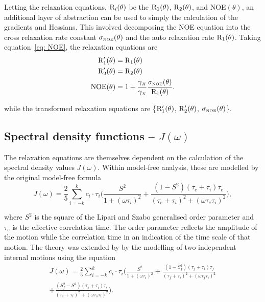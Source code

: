 Letting the relaxation equations, $\mathrm{R}_i(\theta)$ be the $\mathrm{R}_1(\theta)$, $\mathrm{R}_2(\theta)$, and NOE$(\theta)$, an additional layer of abstraction can be used to simply the calculation of the gradients and Hessians.  This involved decomposing the NOE equation into the cross relaxation rate constant $\sigma_{\scriptscriptstyle \mathrm{NOE}}(\theta)$ and the auto relaxation rate $\mathrm{R}_1(\theta)$.  Taking equation~\eqref{eq: NOE}, the relaxation equations are
\begin{align}
 \mathrm{R}_1'(\theta) &= \mathrm{R}_1(\theta) \\
 \mathrm{R}_2'(\theta) &= \mathrm{R}_2(\theta) \\
 \mathrm{NOE}(\theta)  &= 1 + \frac{\gamma_{\scriptscriptstyle H}}{\gamma_{\scriptscriptstyle X}} \frac{\sigma_{\scriptscriptstyle \mathrm{NOE}}(\theta)}{\mathrm{R}_1(\theta)}.
\end{align}

\noindent while the transformed relaxation equations are \{$\mathrm{R}_1'(\theta)$, $\mathrm{R}_2'(\theta)$, $\sigma_{\scriptscriptstyle \mathrm{NOE}}(\theta)$\}.


\subsection{Spectral density functions -- $J(\omega)$}

The relaxation equations are themselves dependent on the calculation of the spectral density values $J(\omega)$.  Within model-free analysis, these are modelled by the original model-free formula \citep{LipariSzabo82a, LipariSzabo82b}
\begin{equation} \label{eq: J(w) model-free generic}
 J(\omega) = \frac{2}{5} \sum_{i=-k}^k c_i \cdot \tau_i \Bigg(
  \frac{S^2}{1 + (\omega \tau_i)^2}
  + \frac{(1 - S^2)(\tau_e + \tau_i)\tau_e}{(\tau_e + \tau_i)^2 + (\omega \tau_e \tau_i)^2}
 \Bigg),
\end{equation}

\noindent where $S^2$ is the square of the Lipari and Szabo generalised order parameter and $\tau_e$ is the effective correlation time.  The order parameter reflects the amplitude of the motion while the correlation time in an indication of the time scale of that motion.  The theory was extended by \citet{Clore90} by the modelling of two independent internal motions using the equation
\begin{multline} \label{eq: J(w) model-free ext generic}
 J(\omega) = \frac{2}{5} \sum_{i=-k}^k c_i \cdot \tau_i \Bigg(
  \frac{S^2}{1 + (\omega \tau_i)^2}
  + \frac{(1 - S^2_f)(\tau_f + \tau_i)\tau_f}{(\tau_f + \tau_i)^2 + (\omega \tau_f \tau_i)^2}       \\
  + \frac{(S^2_f - S^2)(\tau_s + \tau_i)\tau_s}{(\tau_s + \tau_i)^2 + (\omega \tau_s \tau_i)^2}
 \Bigg).
\end{multline}

